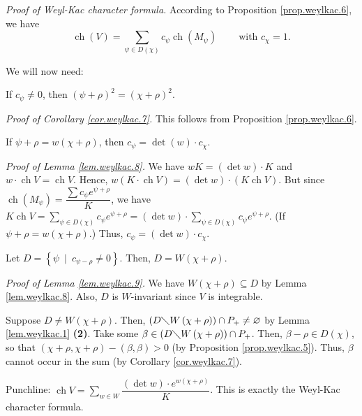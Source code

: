 \documentclass[etingof-lie.tex]{subfiles}
\begin{document}
\textit{Proof of Weyl-Kac character formula.} According to Proposition
\ref{prop.weylkac.6}, we have%
\[
\operatorname*{ch}\left(  V\right)  =\sum_{\psi\in D\left(  \chi\right)
}c_{\psi}\operatorname*{ch}\left(  M_{\psi}\right)
\ \ \ \ \ \ \ \ \ \ \text{with }c_{\chi}=1.
\]


We will now need:

\begin{corollary}
\label{cor.weylkac.7}If $c_{\psi}\neq0$, then $\left(  \psi+\rho\right)
^{2}=\left(  \chi+\rho\right)  ^{2}$.
\end{corollary}

\textit{Proof of Corollary \ref{cor.weylkac.7}.} This follows from Proposition
\ref{prop.weylkac.6}.

\begin{lemma}
\label{lem.weylkac.8}If $\psi+\rho=w\left(  \chi+\rho\right)  $, then
$c_{\psi}=\det\left(  w\right)  \cdot c_{\chi}$.
\end{lemma}

\textit{Proof of Lemma \ref{lem.weylkac.8}.} We have $wK=\left(  \det
w\right)  \cdot K$ and $w\cdot\operatorname*{ch}V=\operatorname*{ch}V$. Hence,
$w\left(  K\cdot\operatorname*{ch}V\right)  =\left(  \det w\right)
\cdot\left(  K\operatorname*{ch}V\right)  $. But since $\operatorname*{ch}%
\left(  M_{\psi}\right)  =\dfrac{\sum c_{\psi}e^{\psi+\rho}}{K}$, we have
$K\operatorname*{ch}V=\sum\limits_{\psi\in D\left(  \chi\right)  }c_{\psi
}e^{\psi+\rho}=\left(  \det w\right)  \cdot\sum\limits_{\psi\in D\left(
\chi\right)  }c_{\psi}e^{\psi+\rho}$. (If $\psi+\rho=w\left(  \chi
+\rho\right)  $.) Thus, $c_{\psi}=\left(  \det w\right)  \cdot c_{\chi}$.

\begin{lemma}
\label{lem.weylkac.9}Let $D=\left\{  \psi\ \mid\ c_{\psi-\rho}\neq0\right\}
$. Then, $D=W\left(  \chi+\rho\right)  $.
\end{lemma}

\textit{Proof of Lemma \ref{lem.weylkac.9}.} We have $W\left(  \chi
+\rho\right)  \subseteq D$ by Lemma \ref{lem.weylkac.8}. Also, $D$ is
$W$-invariant since $V$ is integrable.

Suppose $D\neq W\left(  \chi+\rho\right)  $. Then, $\left(  D\diagdown
W\left(  \chi+\rho\right)  \right)  \cap P_{+}\neq\varnothing$ by Lemma
\ref{lem.weylkac.1} \textbf{(2)}. Take some $\beta\in\left(  D\diagdown
W\left(  \chi+\rho\right)  \right)  \cap P_{+}$. Then, $\beta-\rho\in D\left(
\chi\right)  $, so that $\left(  \chi+\rho,\chi+\rho\right)  -\left(
\beta,\beta\right)  >0$ (by Proposition \ref{prop.weylkac.5}). Thus, $\beta$
cannot occur in the sum (by Corollary \ref{cor.weylkac.7}).

Punchline: $\operatorname*{ch}V=\sum_{w\in W}\dfrac{\left(  \det w\right)
\cdot e^{w\left(  \chi+\rho\right)  }}{K}$. This is exactly the Weyl-Kac
character formula.
\end{document}
